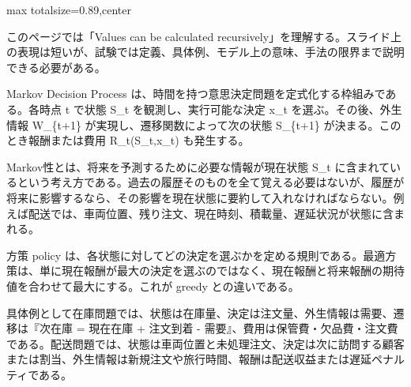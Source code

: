 \begin{minipage}[t]{0.58\textwidth}
\begin{adjustbox}{max totalsize={\textwidth}{0.89\textheight},center}
\begin{minipage}{\textwidth}\scriptsize
{}このページでは「Values can be calculated recursively」を理解する。スライド上の表現は短いが、試験では定義、具体例、モデル上の意味、手法の限界まで説明できる必要がある。\par
Markov Decision Process は、時間を持つ意思決定問題を定式化する枠組みである。各時点 t で状態 S\_t を観測し、実行可能な決定 x\_t を選ぶ。その後、外生情報 W\_\{t+1\} が実現し、遷移関数によって次の状態 S\_\{t+1\} が決まる。このとき報酬または費用 R\_t(S\_t,x\_t) も発生する。\par
Markov性とは、将来を予測するために必要な情報が現在状態 S\_t に含まれているという考え方である。過去の履歴そのものを全て覚える必要はないが、履歴が将来に影響するなら、その影響を現在状態に要約して入れなければならない。例えば配送では、車両位置、残り注文、現在時刻、積載量、遅延状況が状態に含まれる。\par
方策 policy は、各状態に対してどの決定を選ぶかを定める規則である。最適方策は、単に現在報酬が最大の決定を選ぶのではなく、現在報酬と将来報酬の期待値を合わせて最大にする。これが greedy との違いである。\par
具体例として在庫問題では、状態は在庫量、決定は注文量、外生情報は需要、遷移は『次在庫 = 現在在庫 + 注文到着 - 需要』、費用は保管費・欠品費・注文費である。配送問題では、状態は車両位置と未処理注文、決定は次に訪問する顧客または割当、外生情報は新規注文や旅行時間、報酬は配送収益または遅延ペナルティである。\par

\end{minipage}
\end{adjustbox}
\end{minipage}
